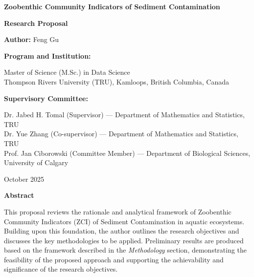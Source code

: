 \documentclass{article}
\begin{document}

\begin{titlepage}
\centering
\vspace*{2cm}

{\LARGE\bfseries Zoobenthic Community Indicators of Sediment Contamination\par}
\vspace{1.2cm}

{\Large\textbf{Research Proposal}\par}
\vspace{1.5cm}

{\large\textbf{Author:} Feng Gu\par}
\vspace{0.5cm}

{\large\textbf{Program and Institution:}\par}
\vspace*{.2cm}
{\large Master of Science (M.Sc.) in Data Science\\
\vspace*{.2cm}
Thompson Rivers University (TRU), Kamloops, British Columbia, Canada\par}
\vspace{1.5cm}

{\Large\textbf{Supervisory Committee:}\par}
\vspace*{.2cm}
{\large
Dr. Jabed H. Tomal (Supervisor) — Department of Mathematics and Statistics, TRU\\
\vspace*{.2cm}
Dr. Yue Zhang (Co-supervisor) — Department of Mathematics and Statistics, TRU\\
\vspace*{.2cm}
Prof. Jan Ciborowski (Committee Member) — Department of Biological Sciences, University of Calgary
\par}

\vfill
{\large October 2025\par}

\end{titlepage}


\clearpage

\begin{center}
    {\Large \textbf{Abstract}}
\end{center}

This proposal reviews the rationale and analytical framework of Zoobenthic Community Indicators (ZCI)
of Sediment Contamination in aquatic ecosystems. 
Building upon this foundation, the author outlines the research objectives and discusses
the key methodologies to be applied.
Preliminary results are produced based on the framework described in the \textit{Methodology} section,
demonstrating the feasibility of the proposed approach 
and supporting the achievability and significance of the research objectives.  
\end{document}
